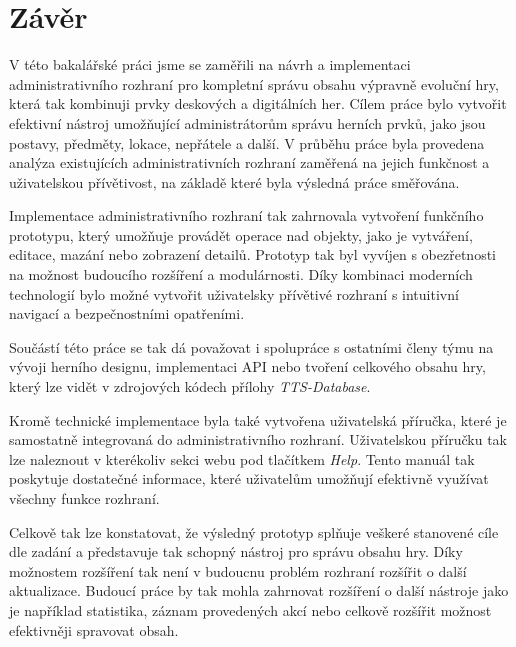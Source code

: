 \chapter{Závěr}
\label{ch:conclusion}

V této bakalářské práci jsme se zaměřili na návrh a implementaci administrativního rozhraní pro kompletní správu obsahu výpravně evoluční hry, která tak kombinuji prvky deskových a digitálních her. Cílem práce bylo vytvořit efektivní nástroj umožňující administrátorům správu herních prvků, jako jsou postavy, předměty, lokace, nepřátele a další. V průběhu práce byla provedena analýza existujících administrativních rozhraní zaměřená na jejich funkčnost a uživatelskou přívětivost, na základě které byla výsledná práce směřována.

Implementace administrativního rozhraní tak zahrnovala vytvoření funkčního prototypu, který umožňuje provádět operace nad objekty, jako je vytváření, editace, mazání nebo zobrazení detailů. Prototyp tak byl vyvíjen s obezřetnosti na možnost budoucího rozšíření a modulárnosti. Díky kombinaci moderních technologií bylo možné vytvořit uživatelsky přívětivé rozhraní s intuitivní navigací a bezpečnostními opatřeními.

Součástí této práce se tak dá považovat i spolupráce s ostatními členy týmu na vývoji herního designu, implementaci API nebo tvoření celkového obsahu hry, který lze vidět v zdrojových kódech přílohy \textit{TTS-Database}.

Kromě technické implementace byla také vytvořena uživatelská příručka, které je samostatně integrovaná do administrativního rozhraní. Uživatelskou příručku tak lze naleznout v kterékoliv sekci webu pod tlačítkem \textit{Help}. Tento manuál tak poskytuje dostatečné informace, které uživatelům umožňují efektivně využívat všechny funkce rozhraní.

Celkově tak lze konstatovat, že výsledný prototyp splňuje veškeré stanovené cíle dle zadání a představuje tak schopný nástroj pro správu obsahu hry. Díky možnostem rozšíření tak není v budoucnu problém rozhraní rozšířit o další aktualizace. Budoucí práce by tak mohla zahrnovat rozšíření o další nástroje jako je například statistika, záznam provedených akcí nebo celkově rozšířit možnost efektivněji spravovat obsah.

\endinput